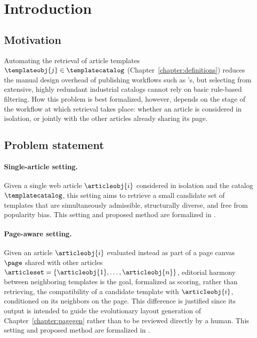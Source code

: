 \section{Introduction}
\label{section:template-retrieval-dual-challenge}

\subsection{Motivation}

Automating the retrieval of article templates $\templateobj{j} \in \templatecatalog$ (Chapter~\ref{chapter:definitions}) reduces the manual design overhead of publishing workflows such as \melody's, but selecting from extensive, highly redundant industrial catalogs cannot rely on basic rule-based filtering. How this problem is best formalized, however, depends on the stage of the workflow at which retrieval takes place: whether an article is considered in isolation, or jointly with the other articles already sharing its page.

\subsection{Problem statement}

\paragraph{Single-article setting.} Given a single web article $\articleobj{i}$ considered in isolation and the catalog $\templatecatalog$, this setting aims to retrieve a small candidate set of templates that are simultaneously admissible, structurally diverse, and free from popularity bias. This setting and proposed method are formalized in .

\paragraph{Page-aware setting.} Given an article $\articleobj{i}$ evaluated instead as part of a page canvas $\page$ shared with other articles $\articleset = \{\articleobj{1}, \dots, \articleobj{n}\}$, editorial harmony between neighboring templates is the goal, formalized as scoring, rather than retrieving, the compatibility of a candidate template with $\articleobj{i}$, conditioned on its neighbors on the page. This difference is justified since its output is intended to guide the evolutionary layout generation of Chapter~\ref{chapter:pagegen} rather than to be reviewed directly by a human. This setting and proposed method are formalized in .

